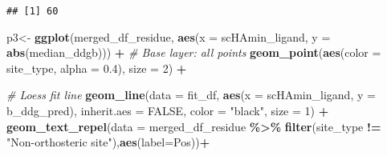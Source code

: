 \documentclass[
]{article}
\newenvironment{Shaded}{\begin{snugshade}}{\end{snugshade}}
\newcommand{\AttributeTok}[1]{\textcolor[rgb]{0.13,0.29,0.53}{#1}}
\newcommand{\CommentTok}[1]{\textcolor[rgb]{0.56,0.35,0.01}{\textit{#1}}}
\newcommand{\ConstantTok}[1]{\textcolor[rgb]{0.56,0.35,0.01}{#1}}
\newcommand{\DecValTok}[1]{\textcolor[rgb]{0.00,0.00,0.81}{#1}}
\newcommand{\FloatTok}[1]{\textcolor[rgb]{0.00,0.00,0.81}{#1}}
\newcommand{\FunctionTok}[1]{\textcolor[rgb]{0.13,0.29,0.53}{\textbf{#1}}}
\newcommand{\NormalTok}[1]{#1}
\newcommand{\OtherTok}[1]{\textcolor[rgb]{0.56,0.35,0.01}{#1}}
\newcommand{\SpecialCharTok}[1]{\textcolor[rgb]{0.81,0.36,0.00}{\textbf{#1}}}
\newcommand{\StringTok}[1]{\textcolor[rgb]{0.31,0.60,0.02}{#1}}
\begin{document}
\begin{verbatim}
## [1] 60
\end{verbatim}

\begin{Shaded}
\begin{Highlighting}[]
\NormalTok{p3}\OtherTok{\textless{}{-}} \FunctionTok{ggplot}\NormalTok{(merged\_df\_residue, }\FunctionTok{aes}\NormalTok{(}\AttributeTok{x =}\NormalTok{ scHAmin\_ligand, }\AttributeTok{y =} \FunctionTok{abs}\NormalTok{(median\_ddgb))) }\SpecialCharTok{+}
  \CommentTok{\# Base layer: all points}
  \FunctionTok{geom\_point}\NormalTok{(}\FunctionTok{aes}\NormalTok{(}\AttributeTok{color =}\NormalTok{ site\_type, }\AttributeTok{alpha =} \FloatTok{0.4}\NormalTok{), }\AttributeTok{size =} \DecValTok{2}\NormalTok{) }\SpecialCharTok{+}
  
  \CommentTok{\# Loess fit line}
  \FunctionTok{geom\_line}\NormalTok{(}\AttributeTok{data =}\NormalTok{ fit\_df, }\FunctionTok{aes}\NormalTok{(}\AttributeTok{x =}\NormalTok{ scHAmin\_ligand, }\AttributeTok{y =}\NormalTok{ b\_ddg\_pred),}
            \AttributeTok{inherit.aes =} \ConstantTok{FALSE}\NormalTok{, }\AttributeTok{color =} \StringTok{"black"}\NormalTok{, }\AttributeTok{size =} \DecValTok{1}\NormalTok{) }\SpecialCharTok{+}
  \FunctionTok{geom\_text\_repel}\NormalTok{(}\AttributeTok{data =}\NormalTok{ merged\_df\_residue }\SpecialCharTok{\%\textgreater{}\%} \FunctionTok{filter}\NormalTok{(site\_type }\SpecialCharTok{!=} \StringTok{"Non{-}orthosteric site"}\NormalTok{),}\FunctionTok{aes}\NormalTok{(}\AttributeTok{label=}\NormalTok{Pos))}\SpecialCharTok{+}
  

\end{Highlighting}
\end{Shaded}
\end{document}
